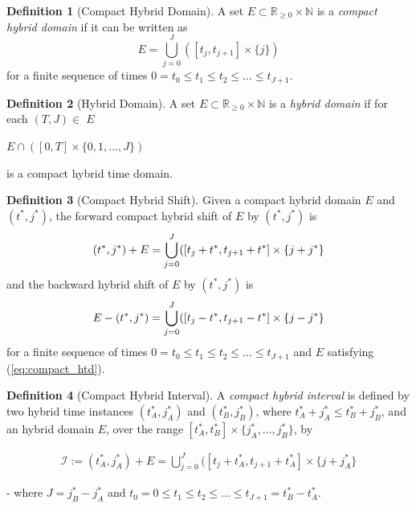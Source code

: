 \documentclass{article}
\theoremstyle{definition}
\newtheorem{definition}{Definition}[section]
\begin{document}
\begin{definition}[Compact Hybrid Domain] A set $E \subset
    \mathbb{R}_{\geq0} \times \mathbb{N}$ is a  \textit{compact hybrid
    domain} if it can be written as
\begin{equation}
    \label{eq:compact_htd}
    E = \bigcup\limits_{j=0}^{J} ([t_j,t_{j+1}] \times \{j\})
\end{equation}
for a finite sequence of times $0 = t_0 \leq t_1 \leq t_2 \leq ... \leq t_{J+1}$.
\end{definition}

\begin{definition}[Hybrid Domain]
A set $E \subset \mathbb{R}_{\geq0} \times \mathbb{N}$ is a \textit{hybrid  domain} if for each $(T,J)\in\;E$
\begin{center}
    $E \cap ([0,T] \times \{0,1,...,J\})$
\end{center} 
is a compact hybrid time domain.
\end{definition}

\begin{definition}[Compact Hybrid Shift] Given a compact hybrid domain $E$
    and $(t^*,j^*)$, the forward {compact hybrid shift} of $E$ by $(t^*,j^*)$ is
\begin{equation}
    (t^*,j^*) + E = \bigcup\limits_{j=0}^{J} ([t_j + t^*,t_{j+1}+t^*] \times \{j+j^*\}\quad\\
\end{equation}
and the backward hybrid shift of $E$ by $(t^*,j^*)$ is
\begin{equation}
    E - (t^*,j^*) = \bigcup\limits_{j=0}^{J} ([t_j - t^*,t_{j+1}-t^*] \times \{j-j^*\}\\
\end{equation}
for a finite sequence of times $0 = t_0 \leq t_1 \leq t_2 \leq ... \leq t_{J+1}$
and $E$ satisfying (\ref{eq:compact_htd}).
\end{definition}

\begin{definition}[Compact Hybrid Interval] A \textit{compact hybrid
    interval} is defined by two hybrid time instances $(t^*_A,j^*_A)$ and
    $(t^*_B,j^*_B)$, where $t^*_A + j^*_A \leq t^*_B + j^*_B$, and an hybrid domain $E$, over the range $[t^*_A,
    t^*_B]\times\{j^*_A,..., j^*_B\}$, by

\begin{gather}
    \mathcal{I} := (t^*_A,j^*_A) + E = \bigcup\limits_{j=0}^{J} ([t_j + t^*_A,t_{j+1} + t^*_A] \times \{j + j^*_A\}
\end{gather}

- where $J = j^*_B - j^*_A$ and $t_0 = 0 \leq t_1 \leq t_2 \leq ... \leq t_{J+1} =
t^*_B - t^*_A$.
\end{definition}
\end{document}
